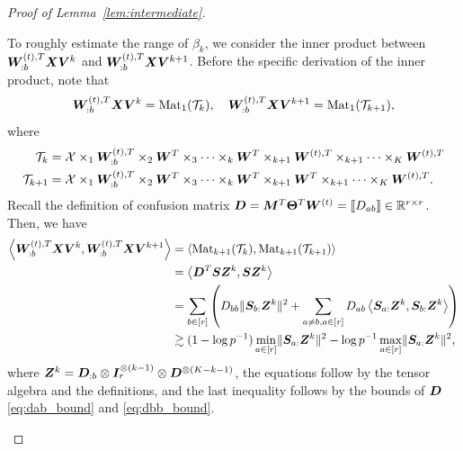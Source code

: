 \documentclass[lettersize,onecolumn,journal]{IEEEtran}
\theoremstyle{definition}
\theoremstyle{definition}
\newcommand{\of}[1]{\left(#1\right)}
\newcommand{\ang}[1]{\left\langle#1\right\rangle}
\begin{document}
\begin{proof}[Proof of Lemma~\ref{lem:intermediate}]
\begin{enumerate}
    To roughly estimate the range of $\beta_k$, we consider the inner product between $\bm{W}_{:b}^{(t),T} \bm X \bm{V}^k$ and $\bm{W}_{:b}^{(t),T} \bm X \bm{V}^{k+1}$. Before the specific derivation of the inner product, note that 
    \begin{equation}
        \bm{W}_{:b}^{(t),T} \bm X \bm{V}^k = \text{Mat}_1(\mathcal{T}_k), \quad  \bm{W}_{:b}^{(t),T} \bm X \bm{V}^{k+1} = \text{Mat}_1(\mathcal{T}_{k+1}),
    \end{equation}
    where 
    \begin{align}
        \mathcal{T}_k &= \mathcal{X} \times_1  \bm{W}_{:b}^{(t),T} \times_2 \bm{W}^T \times_3 \cdots \times_k \bm{W}^T \times_{k+1} \bm{W}^{(t),T} \times_{k+1} \cdots \times_K \bm{W}^{(t),T}\\
        \mathcal{T}_{k+1} &= \mathcal{X} \times_1  \bm{W}_{:b}^{(t),T} \times_2 \bm{W}^T \times_3 \cdots \times_k \bm{W}^T \times_{k+1} \bm{W}^{T} \times_{k+1} \cdots \times_K \bm{W}^{(t),T}. 
    \end{align}
    Recall the definition of confusion matrix $\bm{D} = \bm M^T \boldsymbol{\Theta}^T \bm{W}^{(t)} = \llbracket D_{ab} \rrbracket \in \mathbb{R}^{r \times r}$.
    Then, we have 
    \begin{align}
         \ang{\mW_{:b}^{(t),T} \mX \mV^k , \mW_{:b}^{(t),T} \mX \mV^{k+1}} 
         &  =\ang{ \mat_{k+1}(\tT_k), \mat_{k+1}(\tT_{k+1}) } \label{eq:j11_tensormat} \\
         & =  \ang{ \mD^T \mS \mZ^k ,  \mS \mZ^k   }\\
         & = \sum_{b \in [r]} \of{ D_{bb} \onormSize{}{\mS_{b:}\mZ^k}^2 + \sum_{a \neq b, a \in [r]} D_{ab} \ang{\mS_{a:} \mZ^k, \mS_{b:} \mZ^k}} \\
         & \gtrsim (1 - \log p^{-1}) \min_{a \in [r]}\onormSize{}{\mS_{a:}\mZ^k}^2 - \log p^{-1} \max_{a \in [r]} \onormSize{}{\mS_{a:}\mZ^k}^2, \label{eq:j11inner}
    \end{align}
    where $\bm Z^k = \bm{D}_{:b} \otimes \bm I_r^{\otimes (k-1)} \otimes  \bm{D}^{\otimes (K-k-1)}$, the equations follow by the tensor algebra and the definitions, and the last inequality follows by the bounds of $\bm{D}$ \eqref{eq:dab_bound} and \eqref{eq:dbb_bound}. 
    

\end{enumerate}
\end{proof}
\end{document}
